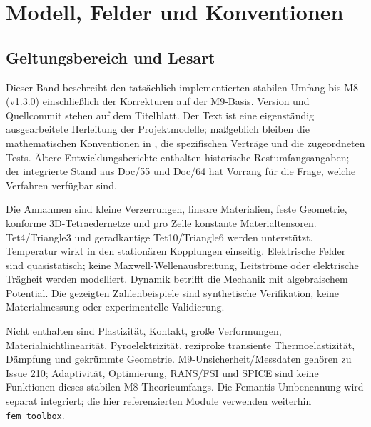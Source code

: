 \chapter{Modell, Felder und Konventionen}\label{chap:conventions}
\section{Geltungsbereich und Lesart}
Dieser Band beschreibt den tatsächlich implementierten stabilen Umfang bis M8
(v1.3.0) einschließlich der Korrekturen auf der M9-Basis. Version und Quellcommit
stehen auf dem Titelblatt. Der Text ist eine eigenständig ausgearbeitete
Herleitung der Projektmodelle; maßgeblich bleiben die mathematischen Konventionen
in , die spezifischen Verträge und die
zugeordneten Tests. Ältere Entwicklungsberichte enthalten historische
Restumfangsangaben; der integrierte Stand aus Doc/55 und Doc/64 hat Vorrang für
die Frage, welche Verfahren verfügbar sind.

Die Annahmen sind kleine Verzerrungen, lineare Materialien, feste Geometrie,
konforme 3D-Tetraedernetze und pro Zelle konstante Materialtensoren.
Tet4/Triangle3 und geradkantige Tet10/Triangle6 werden unterstützt. Temperatur
wirkt in den stationären Kopplungen einseitig. Elektrische Felder sind
quasistatisch; keine Maxwell-Wellenausbreitung, Leitströme oder elektrische
Trägheit werden modelliert. Dynamik betrifft die Mechanik mit algebraischem
Potential. Die gezeigten Zahlenbeispiele sind synthetische Verifikation,
keine Materialmessung oder experimentelle Validierung.

Nicht enthalten sind Plastizität, Kontakt, große Verformungen, Materialnichtlinearität,
Pyroelektrizität, reziproke transiente Thermoelastizität, Dämpfung und
gekrümmte Geometrie. M9-Unsicherheit/Messdaten gehören zu Issue 210;
Adaptivität, Optimierung, RANS/FSI und SPICE sind keine Funktionen dieses
stabilen M8-Theorieumfangs. Die Femantis-Umbenennung wird separat integriert;
die hier referenzierten Module verwenden weiterhin \texttt{fem\_toolbox}.

